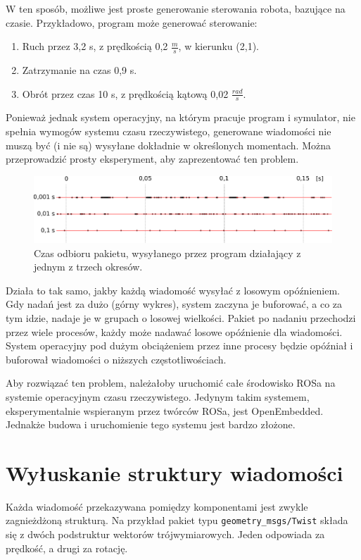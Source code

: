 	W ten sposób, możliwe jest proste generowanie sterowania robota, bazujące na czasie.
	Przykładowo, program może generować sterowanie:
	\begin{enumerate}
		\item Ruch przez 3,2 s, z prędkością 0,2 $\frac{m}{s}$, w kierunku (2,1).
		\item Zatrzymanie na czas 0,9 s.
		\item Obrót przez czas 10 s, z prędkością kątową 0,02 $\frac{rad}{s}$.
	\end{enumerate}
	
	Ponieważ jednak system operacyjny, na którym pracuje program i symulator, nie spełnia wymogów systemu czasu rzeczywistego, generowane wiadomości
	nie muszą być (i nie są) wysyłane dokładnie w określonych momentach. Można przeprowadzić prosty eksperyment, aby zaprezentować ten problem.
	
	\begin{figure}[H]
	\centering
	\includegraphics[width=\textwidth]{graphics/gramofon.pdf}
	\caption{Czas odbioru pakietu, wysyłanego przez program działający z jednym z trzech okresów.}
	\end{figure}
	
	Działa to tak samo, jakby każdą wiadomość wysyłać z losowym opóźnieniem.
	Gdy nadań jest za dużo (górny wykres), system zaczyna je buforować, a co za tym idzie, nadaje je w grupach o losowej wielkości.
	Pakiet po nadaniu przechodzi przez wiele procesów, każdy może nadawać losowe opóźnienie dla wiadomości.
	System operacyjny pod dużym obciążeniem przez inne procesy będzie opóźniał i buforował wiadomości o niższych częstotliwościach.
	
	Aby rozwiązać ten problem, należałoby uruchomić całe środowisko ROSa na systemie operacyjnym czasu rzeczywistego.
	Jedynym takim systemem, eksperymentalnie wspieranym przez twórców ROSa, jest OpenEmbedded.
	Jednakże budowa i uruchomienie tego systemu jest bardzo złożone.
		
\section{Wyłuskanie struktury wiadomości}
	\label{sec:dziadzio}
	Każda wiadomość przekazywana pomiędzy komponentami jest zwykle zagnieżdżoną strukturą.
	Na przykład pakiet typu \texttt{geometry\_msgs/Twist} składa się z dwóch podstruktur wektorów trójwymiarowych.
	Jeden odpowiada za prędkość, a drugi za rotację.
	
